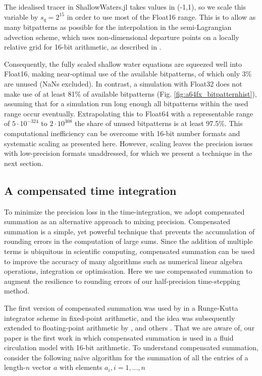 The idealised tracer in ShallowWaters.jl takes values in (-1,1), so we scale this variable by $s_q = 2^{15}$
in order to use most of the Float16 range. This is to allow as many bitpatterns as possible for the interpolation
in the semi-Lagrangian advection scheme, which uses non-dimensional departure points on a locally relative
grid for 16-bit arithmetic, as described in \cite{Klower2020a}.

Consequently, the fully scaled shallow water equations are squeezed well into Float16, making near-optimal
use of the available bitpatterns, of which only 3\% are unused (NaNs excluded). In contrast, a simulation with
Float32 does not make use of at least 81\% of available bitpatterns (Fig. \ref{fig:a64fx_bitpatternhist}), assuming
that for a simulation run long enough all bitpatterns within the used range occur eventually. Extrapolating this
to Float64 with a representable range of $5 \cdot 10^{-324}$ to $2 \cdot 10^{308}$ the share of unused bitpatterns
is at least 97.5\%. This computational inefficiency can be overcome with 16-bit number formats and systematic
scaling as presented here. However, scaling leaves the precision issues with low-precision formats unaddressed,
for which we present a technique in the next section.

\subsection{A compensated time integration}
\label{sec:compensated_time_integration}

To minimize the precision loss in the time-integration, we adopt compensated summation as an alternative approach
to mixing precision. Compensated summation is a simple, yet powerful technique that prevents the accumulation of
rounding errors in the computation of large sums. Since the addition of multiple terms is ubiquitous in scientific computing,
compensated summation can be used to improve the accuracy of many algorithms such as numerical linear algebra
operations, integration or optimisation. Here we use compensated summation to augment the resilience to rounding
errors of our half-precision time-stepping method. 

The first version of compensated summation was used by \cite{Gill1951} in a Runge-Kutta integrator scheme in
fixed-point arithmetic, and the idea was subsequently extended to floating-point arithmetic by \cite{Kahan1965},
\cite{Moller1965} and others \citep{Vitasek1969,Linnainmaa1974,Higham1993}. That we are aware of, our paper
is the first work in which compensated summation is used in a fluid circulation model with 16-bit arithmetic.
To understand compensated summation, consider the following naïve algorithm for the summation of all the
entries of a length-$n$ vector $a$ with elements $a_i, i = 1,...,n$

